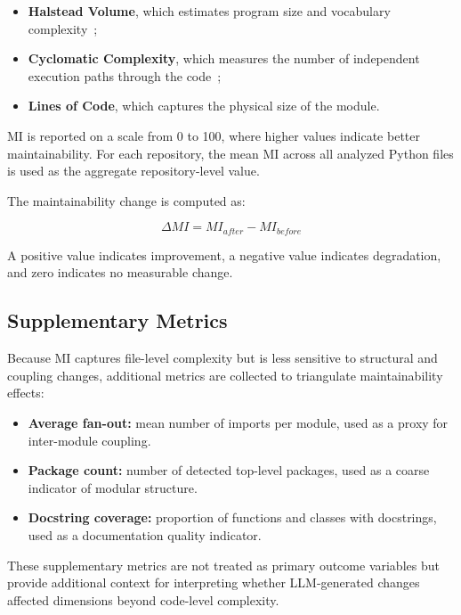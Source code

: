 \begin{itemize}
    \item \textbf{Halstead Volume}, which estimates program size and vocabulary complexity~\cite{halstead1977elements};
    \item \textbf{Cyclomatic Complexity}, which measures the number of independent execution paths through the code~\cite{mccabe1976complexity};
    \item \textbf{Lines of Code}, which captures the physical size of the module.
\end{itemize}

MI is reported on a scale from 0 to 100, where higher values indicate better maintainability. For each repository, the mean MI across all analyzed Python files is used as the aggregate repository-level value.

The maintainability change is computed as:

\begin{equation}
\Delta MI = MI_{after} - MI_{before}
\end{equation}

A positive value indicates improvement, a negative value indicates degradation, and zero indicates no measurable change.

\subsection{Supplementary Metrics}

Because MI captures file-level complexity but is less sensitive to structural and coupling changes, additional metrics are collected to triangulate maintainability effects:

\begin{itemize}
    \item \textbf{Average fan-out:} mean number of imports per module, used as a proxy for inter-module coupling.
    \item \textbf{Package count:} number of detected top-level packages, used as a coarse indicator of modular structure.
    \item \textbf{Docstring coverage:} proportion of functions and classes with docstrings, used as a documentation quality indicator.
\end{itemize}

These supplementary metrics are not treated as primary outcome variables but provide additional context for interpreting whether LLM-generated changes affected dimensions beyond code-level complexity.

